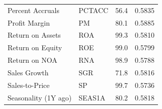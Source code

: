 \begin{table}[ht]
\begin{tabular}{llll}
  Percent Accruals & PCTACC & 56.4 & 0.5835 \\ 
  Profit Margin & PM & 80.1 & 0.5885 \\ 
  Return on Assets & ROA & 99.3 & 0.5810 \\ 
  Return on Equity & ROE & 99.0 & 0.5799 \\ 
  Return on NOA & RNA & 98.9 & 0.5788 \\ 
  Sales Growth & SGR & 71.8 & 0.5816 \\ 
  Sales-to-Price & SP & 99.7 & 0.5736 \\ 
  Seasonality (1Y ago) & SEAS1A & 80.2 & 0.5818 \\ 
   \hline
\end{tabular}
\end{table}
